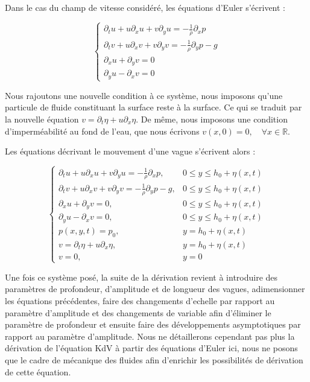 Dans le cas du champ de vitesse considéré, les équations d'Euler s'écrivent :

$$\begin{cases}
    \partial_t u + u\partial_x u + v\partial_y u = - \frac{1}{\rho} \partial_x p \\
    \partial_t v +  u\partial_x v + v \partial_y v = - \frac{1}{\rho}\partial_y p - g \\
    \partial_xu + \partial_y v = 0 \\
    \partial_y u - \partial_x v = 0
\end{cases}$$

Nous rajoutons une nouvelle condition à ce système, nous imposons qu'une particule de fluide constituant la surface reste à la surface. Ce qui se traduit par la nouvelle équation $v = \partial_t \eta + u\partial_x \eta$.
De même, nous imposons une condition d'imperméabilité au fond de l'eau, que nous écrivons $v(x,0) = 0, \quad \forall x \in \mathbb{R}$.

Les équations décrivant le mouvement d'une vague s'écrivent alors :

$$\begin{cases}
    \partial_t u + u\partial_x u + v\partial_y u = - \frac{1}{\rho} \partial_x p, & 0 \leq y \leq h_0 + \eta(x,t) \\
    \partial_t v +  u\partial_x v + v \partial_y v = - \frac{1}{\rho}\partial_y p - g, & 0 \leq y \leq h_0 + \eta(x,t)\\
    \partial_xu + \partial_y v = 0, & 0 \leq y \leq h_0 + \eta(x,t)\\
    \partial_y u - \partial_x v = 0, & 0 \leq y \leq h_0 + \eta(x,t) \\
    p(x,y,t) = p_0, & y = h_0 + \eta(x,t) \\
    v = \partial_t \eta + u \partial_x \eta, & y = h_0 + \eta(x,t) \\
    v = 0, & y = 0
\end{cases}$$

Une fois ce système posé, la suite de la dérivation revient à introduire des paramètres de profondeur, d'amplitude et de longueur des vagues, adimensionner les équations précédentes, faire des changements d'echelle par rapport au paramètre d'amplitude et des changements de variable afin d'éliminer le paramètre de profondeur et ensuite faire des développements asymptotiques par rapport au paramètre d'amplitude. 
Nous ne détaillerons cependant pas plus la dérivation de l'équation KdV à partir des équations d'Euler ici, nous ne posons que le cadre de mécanique des fluides afin d'enrichir les possibilités de dérivation de cette équation.

